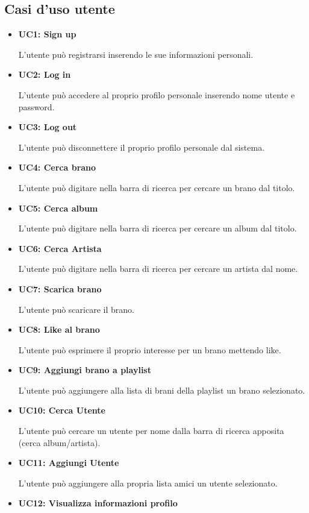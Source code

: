 \subsection{Casi d'uso utente}
\begin{itemize}
      \item \textbf{UC1: Sign up} 
            
      L'utente può registrarsi inserendo le sue informazioni personali.
      \item \textbf{UC2: Log in}
      
      L'utente può accedere al proprio profilo personale inserendo nome utente e password.
      \item \textbf{UC3: Log out} 
      
      L'utente può disconnettere il proprio profilo personale dal sistema.     
      \item \textbf{UC4: Cerca brano}
      
      L'utente può digitare nella barra di ricerca per cercare un brano dal titolo.
      \item \textbf{UC5: Cerca album}
      
      L'utente può digitare nella barra di ricerca per cercare un album dal titolo.
      \item \textbf{UC6: Cerca Artista}
      
      L'utente può digitare nella barra di ricerca per cercare un artista dal nome.
      \item \textbf{UC7: Scarica brano}
      
      L'utente può scaricare il brano.
      \item \textbf{UC8: Like al brano} 
      
      L'utente può esprimere il proprio interesse per un brano mettendo like.
      \item \textbf{UC9: Aggiungi brano a playlist}
      
      L'utente può aggiungere alla lista di brani della playlist un brano selezionato.
      \item \textbf{UC10: Cerca Utente} 
      
      L'utente può cercare un utente per nome dalla barra di ricerca apposita (cerca album/artista).
      \item \textbf{UC11: Aggiungi Utente} 
      
      L'utente può aggiungere alla propria lista amici un utente selezionato.
      \item \textbf{UC12: Visualizza informazioni profilo} 
      

\end{itemize}
